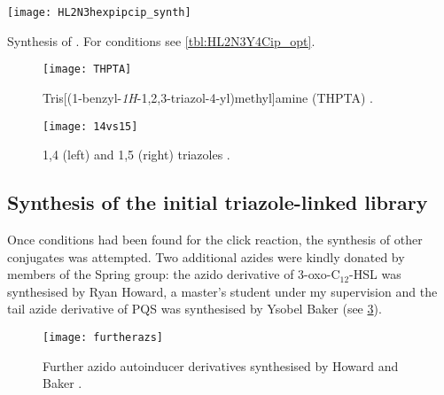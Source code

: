 \begin{scheme}[H]
	\begin{center}
		\texttt{[image: HL2N3hexpipcip\_synth]}
		\caption{Synthesis of . For conditions see \ref{tbl:HL2N3Y4Cip_opt}. \label{sch:HL2N3Y4Cip_synth}}
	\end{center}
\end{scheme}


\begin{figure}[H]
	\begin{center}
		\texttt{[image: THPTA]}
		\caption{Tris[(1-benzyl-\textit{1H}-1,2,3-triazol-4-yl)methyl]amine (THPTA)  .\label{fig:THPTA}}
	\end{center}
\end{figure}

\begin{figure}[H]
	\begin{center}
		\texttt{[image: 14vs15]}
		\caption{1,4 (left) and 1,5 (right) triazoles .\label{fig:14vs15}}
	\end{center}
\end{figure}

\subsection{Synthesis of the initial triazole-linked library}

Once conditions had been found for the click reaction, the synthesis of other conjugates was attempted. 
Two additional azides were kindly donated by members of the Spring group: 
the azido derivative of 3-oxo-C$_{12}$-HSL  was synthesised by Ryan Howard, a master's student under my supervision\cite{Howard2015} and
the tail azide derivative of PQS  was synthesised by Ysobel Baker\cite{Baker2015} (see \ref{fig:furtherazs}).

\begin{figure}[H]
	\begin{center}
		\texttt{[image: furtherazs]}
		\caption{Further azido autoinducer derivatives synthesised by Howard\cite{Howard2015}  and Baker\cite{Baker2015} .\label{fig:furtherazs}} 
	\end{center}
\end{figure}

